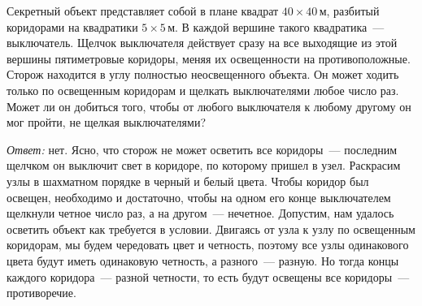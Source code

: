 \problem
Секретный объект представляет собой в плане квадрат $40 \times 40\,\text{м}$,
разбитый коридорами на квадратики $5 \times 5\,\text{м}$.
В каждой вершине такого квадратика~--- выключатель.
Щелчок выключателя действует сразу на все выходящие из этой вершины
пятиметровые коридоры, меняя их освещенности на противоположные.
Сторож находится в углу полностью неосвещенного объекта.
Он может ходить только по освещенным коридорам и щелкать выключателями любое
число раз.
Может ли он добиться того, чтобы от любого выключателя к любому другому он мог
пройти, не щелкая выключателями?

\solution
\emph{Ответ:} нет.
Ясно, что сторож не может осветить все коридоры~--- последним щелчком он
выключит свет в коридоре, по которому пришел в узел.
Раскрасим узлы в шахматном порядке в черный и белый цвета.
Чтобы коридор был освещен, необходимо и достаточно, чтобы на одном его конце
выключателем щелкнули четное число раз, а на другом~--- нечетное.
Допустим, нам удалось осветить объект как требуется в условии.
Двигаясь от узла к узлу по освещенным коридорам, мы будем чередовать цвет и
четность, поэтому все узлы одинакового цвета будут иметь одинаковую четность, а
разного~--- разную.
Но тогда концы каждого коридора~--- разной четности, то есть будут освещены все
коридоры~--- противоречие.

\endproblem
